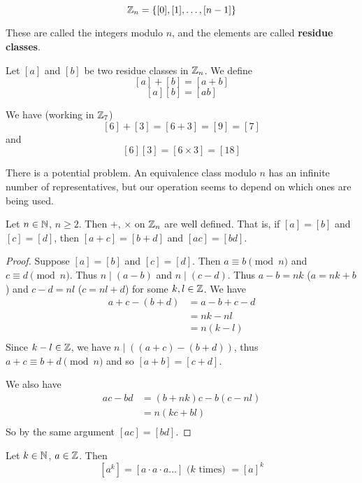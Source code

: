 \documentclass{article}
\begin{document}
  \begin{proposition}
    \[\mathbb{Z}_n = \{[0], [1], \ldots, [n-1]\}\]

    These are called the integers modulo $n$, and the elements are called \textbf{residue classes}.
  \end{proposition}
  \begin{definition}
    Let $[a]$ and $[b]$ be two residue classes in $\mathbb{Z}_n$. We define
    \[
      [a] + [b] = [a+b]
    \]
    \[
      [a][b] = [ab]
    \]
  \end{definition}
  \begin{example}
    We have (working in $\mathbb{Z}_7$)
    \[
      [6] + [3] = [6+3] = [9] = [7]
    \]
    and
    \[
      [6][3] = [6 \times 3] = [18]
    \]
  \end{example}
  \begin{remark}
    There is a potential problem. An equivalence class modulo $n$ has an infinite number of representatives, but our operation seems to depend on which ones are being used.
  \end{remark}
  \begin{theorem}
    Let $n \in \mathbb{N}$, $n \geq 2$. Then $+$, $\times$ on $\mathbb{Z}_n$ are well defined.
    That is, if $[a] = [b]$ and $[c] = [d]$, then $[a+c]=[b+d]$ and $[ac] = [bd]$.
  \end{theorem}
  \begin{proof}
    Suppose $[a] = [b]$ and $[c] = [d]$. Then $a \equiv b \pmod{n}$ and $c \equiv d \pmod{n}$. Thus $n \mid (a-b)$ and $n \mid (c-d)$. Thus $a-b = nk$ ($a = nk + b$) and $c-d = nl$ ($c = nl + d$) for some $k, l \in \mathbb{Z}$.
    We have
    \begin{align*}
      a+c - (b+d) &= a - b + c - d\\
      &= nk - nl\\
      &= n(k-l)\\
    \end{align*}
    Since $k - l \in \mathbb{Z}$, we have $n \mid ((a+c) - (b+d))$, thus $a + c \equiv b + d \pmod{n}$ and so $[a+b] = [c+d]$.

    We also have
    \begin{align*}
      ac - bd &= (b + nk)c - b(c - nl)\\
      &= n(kc + bl)\\
    \end{align*}
    So by the same argument $[ac] = [bd]$.
  \end{proof}
  \begin{definition}
    Let $k \in \mathbb{N}$, $a \in \mathbb{Z}$. Then
    \[
      [a^k] = [a\cdot a \cdot a \dots] \text{ ($k$ times) } = [a]^k
    \]
  \end{definition}
\end{document}

